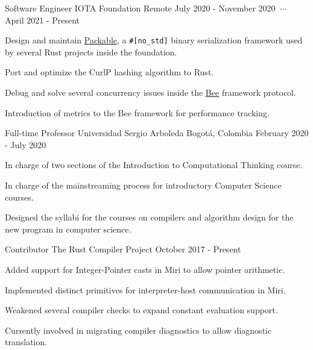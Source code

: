 


\begin{cventries}

    \cventry
    {Software Engineer}
    {IOTA Foundation}
    {Remote}
    {July 2020 - November 2020 $\ \cdots\ $ April 2021 - Present}
    {
        \begin{cvitems}
        \item Design and maintain \href{https://crates.io/crates/packable}{\underline{Packable}}, a \texttt{\#[no\_std]} binary serialization framework used by several Rust projects inside the foundation.
        \item Port and optimize the CurlP hashing algorithm to Rust.
        \item Debug and solve several concurrency issues inside the \href{https://github.com/iotaledger/bee/}{\underline{Bee}} framework protocol.
        \item Introduction of metrics to the Bee framework for performance tracking.
        \end{cvitems}
    }

    \cventry
    {Full-time Professor}
    {Universidad Sergio Arboleda}
    {Bogotá, Colombia}
    {February 2020 - July 2020}
    {
        \begin{cvitems}
        \item In charge of two sections of the Introduction to Computational Thinking course.
        \item In charge of the mainstreaming process for introductory Computer Science courses.
        \item Designed the syllabi for the courses on compilers and algorithm design for the new program in computer science.
        \end{cvitems}
    }

    \cventry
    {Contributor}
    {The Rust Compiler Project}
    {}
    {October 2017 - Present}
    {
        \begin{cvitems}
        \item Added support for Integer-Pointer casts in Miri to allow pointer arithmetic.
        \item Implemented distinct primitives for interpreter-host communication in Miri.
        \item Weakened several compiler checks to expand constant evaluation support.
        \item Currently involved in migrating compiler diagnostics to allow diagnostic translation.
        \end{cvitems}
    }


\end{cventries}
